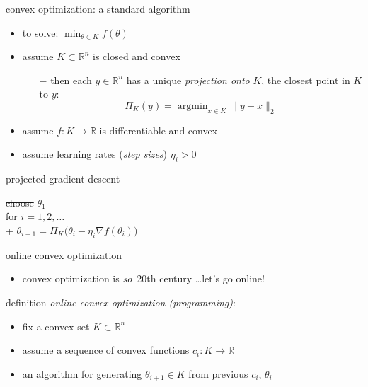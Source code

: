\documentclass[svgnames,
               hyperref={colorlinks,citecolor=DeepPink4,linkcolor=FireBrick,urlcolor=Maroon},
               usepdftitle=false]  %
               {beamer}
\newcommand{\grad}{\nabla}
\newcommand{\argmin}{\operatorname{argmin}}
\newcommand{\RR}{\mathbb{R}}
\newcommand{\ds}{\displaystyle}
\begin{document}
\begin{frame}{convex optimization: a standard algorithm}

\begin{itemize}
\item to solve: \quad $\ds \min_{\theta \in K} f(\theta)$
\item assume $K\subset \RR^n$ is closed and convex
    \begin{itemize}
    \item[$-$] then each $y\in \RR^n$ has a unique \emph{projection onto } $K$, the closest point in $K$ to $y$:
    $$\Pi_K(y) = \argmin_{x\in K} \|y - x\|_2$$
    \end{itemize}
\item assume $f:K\to \RR$ is differentiable and convex
\item assume learning rates (\emph{step sizes}) $\eta_i>0$
\end{itemize}

\begin{block}{projected gradient descent}

\begin{pseudo*}
\st{choose} $\theta_1$ \\
for $i = 1,2,\dots$ \\+
    $\theta_{i+1} = \Pi_K \big(\theta_i - \eta_i \grad f(\theta_i)\big)$
\end{pseudo*}
\end{block}
\end{frame}


\begin{frame}{online convex optimization}

\begin{itemize}
\item convex optimization is \emph{so}\, 20th century \dots let's go online!
\end{itemize}

\begin{block}{definition}
\emph{online convex optimization (programming)}:

\begin{itemize}
\item fix a convex set $K\subset \RR^n$
\item assume a sequence of convex functions $c_i:K\to \RR$
\item an algorithm for generating $\theta_{i+1} \in K$ from previous $c_i$, $\theta_i$
\end{itemize}
\end{block}
\end{frame}
\end{document}
